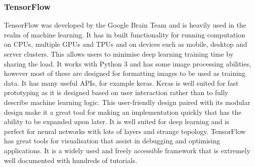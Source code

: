 \documentclass[12pt]{article}
\begin{document}
    \subsubsection{TensorFlow}
TensorFlow was developed by the Google Brain Team and is heavily used in the realm of machine learning. It has in built functionality for running computation on CPUs, multiple GPUs and TPUs and on devices such as mobile, desktop and server clusters. This allows users to minimise deep learning training time by sharing the load.\bigbreak 
\noindent
It works with Python 3 and has some image processing abilities, however most of these are designed for formatting images to be used as training data. It has many useful APIs, for example keras. Keras is well suited for fast prototyping as it is designed based on user interaction rather than to fully describe machine learning logic. This user-friendly design paired with its modular design make it a great tool for making an implementation quickly that has the ability to be expanded upon later.\bigbreak 
\noindent
It is well suited for deep learning and is perfect for neural networks with lots of layers and strange topology. TensorFlow has great tools for visualisation that assist in debugging and optimising applications. It is a widely used and freely accessible framework that is extremely well documented with hundreds of tutorials.
\end{document}
